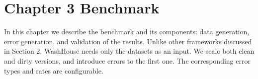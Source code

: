 \chapter{Chapter 3 Benchmark}
In this chapter we describe the benchmark and its components: data generation, error generation, and validation of the results.
Unlike other frameworks discussed in Section 2, WashHouse needs only the datasets as an input. We scale both clean and dirty versions, and introduce errors to the first one.
The corresponding error types and rates are configurable.




